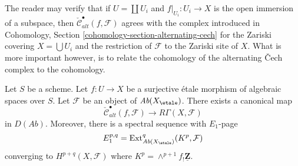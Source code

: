 \noindent
The reader may verify that if $U = \coprod U_i$ and $f|_{U_i} : U_i \to X$
is the open immersion of a subspace, then
$\check{\mathcal{C}}_{alt}^\bullet(f, \mathcal{F})$ agrees with the complex
introduced in
Cohomology, Section \ref{cohomology-section-alternating-cech}
for the Zariski covering $X = \bigcup U_i$ and the restriction
of $\mathcal{F}$ to the Zariski site of $X$. What is more important
however, is to relate the cohomology of the alternating
{\v C}ech complex to the cohomology.

\begin{lemma}
\label{lemma-alternating-cech-to-cohomology}
Let $S$ be a scheme. Let $f : U \to X$ be a surjective \'etale morphism
of algebraic spaces over $S$. Let $\mathcal{F}$ be an object of
$\textit{Ab}(X_\etale)$. There exists a canonical map
$$
\check{\mathcal{C}}^\bullet_{alt}(f, \mathcal{F})
\longrightarrow
R\Gamma(X, \mathcal{F})
$$
in $D(\textit{Ab})$. Moreover, there is a spectral sequence with $E_1$-page
$$
E_1^{p, q} =
\text{Ext}_{\textit{Ab}(X_\etale)}^q(K^p, \mathcal{F})
$$
converging to $H^{p + q}(X, \mathcal{F})$ where
$K^p = \wedge^{p + 1}f_!\underline{\mathbf{Z}}$.
\end{lemma}


